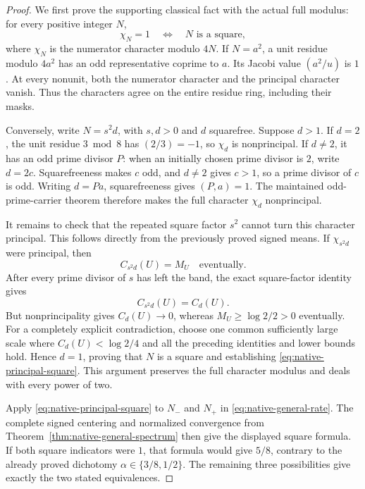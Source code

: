 \documentclass[11pt]{article}
\begin{document}
\begin{proof}
We first prove the supporting classical fact with the actual full
modulus: for every positive integer \(N\),
\begin{equation}\label{eq:native-principal-square}
                  \chi_N=1\quad\Longleftrightarrow\quad N\text{ is a square},
\end{equation}
where \(\chi_N\) is the numerator character modulo \(4N\).
If \(N=a^2\), a unit residue modulo \(4a^2\) has an odd representative
coprime to \(a\). Its Jacobi value \((a^2/u)\) is \(1\).
At every nonunit, both the numerator character and the principal
character vanish. Thus the characters agree on the entire residue
ring, including their masks.

Conversely, write \(N=s^2d\), with \(s,d>0\) and \(d\) squarefree.
Suppose \(d>1\). If \(d=2\), the unit residue \(3\bmod8\) has
\((2/3)=-1\), so \(\chi_d\) is nonprincipal.
If \(d\ne2\), it has an odd prime divisor \(P\): when an initially
chosen prime divisor is \(2\), write \(d=2c\). Squarefreeness makes
\(c\) odd, and \(d\ne2\) gives \(c>1\), so a prime divisor of \(c\)
is odd. Writing \(d=Pa\), squarefreeness gives \((P,a)=1\).
The maintained odd-prime-carrier theorem therefore makes the full
character \(\chi_d\) nonprincipal.

It remains to check that the repeated square factor \(s^2\) cannot
turn this character principal. This follows directly from the
previously proved signed means. If \(\chi_{s^2d}\) were principal,
then
\[
 C_{s^2d}(U)=M_U\quad\text{eventually}.
\]
After every prime divisor of \(s\) has left the band, the exact
square-factor identity gives
\[
 C_{s^2d}(U)=C_d(U).
\]
But nonprincipality gives \(C_d(U)\to0\), whereas
\(M_U\ge\log2/2>0\) eventually. For a completely explicit
contradiction, choose one common sufficiently large scale where
\(C_d(U)<\log2/4\) and all the preceding identities and lower bounds
hold. Hence \(d=1\), proving that \(N\) is a square and establishing
\eqref{eq:native-principal-square}. This argument preserves the full
character modulus and deals with every power of two.

Apply \eqref{eq:native-principal-square} to \(N_-\) and \(N_+\) in
\eqref{eq:native-general-rate}. The complete signed centering and
normalized convergence from Theorem~\ref{thm:native-general-spectrum}
then give the displayed square formula. If both square indicators
were \(1\), that formula would give \(5/8\), contrary to the already
proved dichotomy \(\alpha\in\{3/8,1/2\}\). The remaining three
possibilities give exactly the two stated equivalences.
\end{proof}
\end{document}
